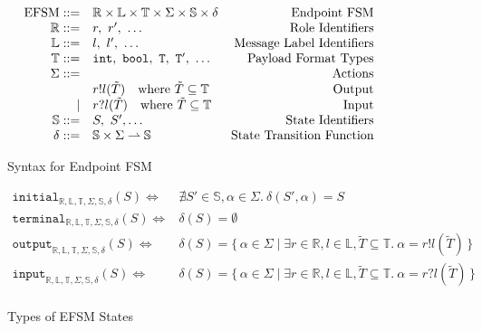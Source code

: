 \begin{figure}[!hb]
\doublespacing
\[
\begin{array}{rlr}

\text{EFSM} ::= & \mathbb{R} \times \mathbb{L} \times \mathbb{T} \times \Sigma \times \mathbb{S} \times \delta & \text{Endpoint FSM} \\

\mathbb{R} ::= & r,~r',~\dots & \text{Role Identifiers} \\

\mathbb{L} ::= & l,~l',~\dots & \text{Message Label Identifiers} \\

\mathbb{T} ::= & \tt{int},~\tt{bool},~T,~T',~\dots & \text{Payload Format Types} \\

\Sigma ::= & & \text{Actions} \\
     & r!l(\tilde{T}) \quad \text{where } \tilde{T} \subseteq \mathbb{T} & \text{Output} \\
\mid & r?l(\tilde{T}) \quad \text{where } \tilde{T} \subseteq \mathbb{T} & \text{Input} \\

\mathbb{S} ::= & S,~S',\dots & \text{State Identifiers} \\

\delta ::= & \mathbb{S} \times \Sigma \rightharpoonup \mathbb{S} & \text{State Transition Function} \\

\end{array}
\]
\singlespacing
\caption{Syntax for Endpoint FSM}
\end{figure}

\begin{figure}[!hb]
\doublespacing
\[
\begin{array}{rl}

\texttt{initial}_{\mathbb{R}, \mathbb{L}, \mathbb{T}, \Sigma, \mathbb{S}, \delta}(S) \iff & \nexists S' \in \mathbb{S},\alpha \in \Sigma.~\delta(S',\alpha) = S \\
\texttt{terminal}_{\mathbb{R}, \mathbb{L}, \mathbb{T}, \Sigma, \mathbb{S}, \delta}(S) \iff & \delta(S) = \emptyset \\
\texttt{output}_{\mathbb{R}, \mathbb{L}, \mathbb{T}, \Sigma, \mathbb{S}, \delta}(S) \iff & \delta(S) = \{\,\alpha \in \Sigma \mid \exists r \in \mathbb{R}, l \in \mathbb{L}, \tilde{T} \subseteq{\mathbb{T}}.~\alpha = r!l(\tilde{T})\,\} \\
\texttt{input}_{\mathbb{R}, \mathbb{L}, \mathbb{T}, \Sigma, \mathbb{S}, \delta}(S) \iff & \delta(S) = \{\,\alpha \in \Sigma \mid \exists r \in \mathbb{R}, l \in \mathbb{L}, \tilde{T} \subseteq{\mathbb{T}}.~\alpha = r?l(\tilde{T})\,\} \\
\end{array}
\]
\singlespacing
\caption{Types of EFSM States}
\end{figure}
